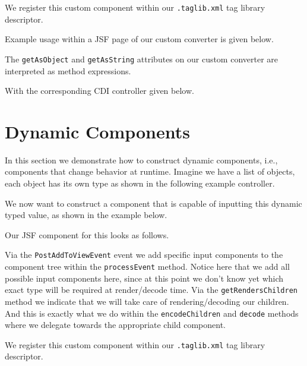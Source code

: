 We register this custom component within our \texttt{.taglib.xml} tag library descriptor.


Example usage within a JSF page of our custom converter is given below.

The \texttt{getAsObject} and \texttt{getAsString} attributes on our custom converter are interpreted as method expressions.

With the corresponding CDI controller given below.



\section{Dynamic Components}
In this section we demonstrate how to construct dynamic components, i.e., components that change behavior at runtime.
Imagine we have a list of objects, each object has its own type as shown in the following example controller.


We now want to construct a component that is capable of inputting this dynamic typed value, as shown in the example below.


Our JSF component for this looks as follows.

Via the \texttt{PostAddToViewEvent} event we add specific input components to the component tree within the \texttt{processEvent} method.
Notice here that we add all possible input components here,  since at this point we don't know yet which exact type will be required at render/decode time.
Via the \texttt{getRendersChildren} method we indicate that we will take care of rendering/decoding our children.
And this is exactly what we do within the \texttt{encodeChildren} and \texttt{decode} methods where we delegate towards the appropriate child component.

We register this custom component within our \texttt{.taglib.xml} tag library descriptor.


